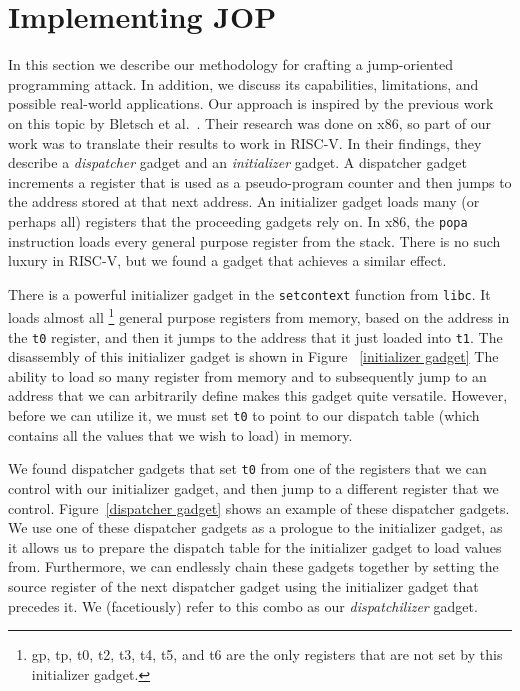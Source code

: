 \section{Implementing JOP}

In this section we describe our methodology for crafting a jump-oriented
programming attack. In addition, we discuss its capabilities, limitations, and
possible real-world applications. Our approach is inspired by the previous work
on this topic by Bletsch et al.~\cite{bletsch11jopx86}. Their research was done
on x86, so part of our work was to translate their results to work in RISC-V. In
their findings, they describe a \textit{dispatcher} gadget and an
\textit{initializer} gadget. A dispatcher gadget increments a register that is
used as a pseudo-program counter and then jumps to the address stored at that
next address. An initializer gadget loads many (or perhaps all) registers that
the proceeding gadgets rely on. In x86, the \verb|popa| instruction loads every
general purpose register from the stack. There is no such luxury in RISC-V, but
we found a gadget that achieves a similar effect.

There is a powerful initializer gadget in the \verb|setcontext| function from
\verb|libc|. It loads almost all%
\footnote{gp, tp, t0, t2, t3, t4, t5, and t6 are the only registers that are not set by this
initializer gadget.}
general purpose registers from memory, based on the address in the \verb|t0|
register, and then it jumps to the address that it just loaded into \verb|t1|.
The disassembly of this initializer gadget is shown in Figure~%
\ref{initializer gadget} The ability to load so many register from memory and
to subsequently jump to an address that we can arbitrarily define makes this
gadget quite versatile. However, before we can utilize it, we must set \verb|t0|
to point to our dispatch table (which contains all the values that we wish to
load) in memory.

We found dispatcher gadgets that set \verb|t0| from one of the registers that we
can control with our initializer gadget, and then jump to a different register
that we control. Figure~\ref{dispatcher gadget} shows an example of these
dispatcher gadgets. We use one of these dispatcher gadgets as a prologue to the
initializer gadget, as it allows us to prepare the dispatch table for the
initializer gadget to load values from. Furthermore, we can endlessly chain
these gadgets together by setting the source register of the next dispatcher
gadget using the initializer gadget that precedes it. We (facetiously) refer to
this combo as our \textit{dispatchilizer} gadget.

